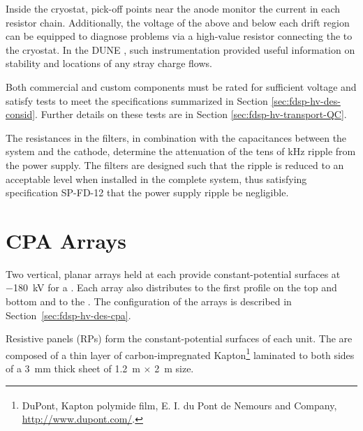 Inside the cryostat, pick-off points near the anode monitor the current  
in each resistor chain.  Additionally, the voltage of the  above and below each drift region can be equipped to diagnose problems via a high-value resistor connecting the  to the cryostat.  In the DUNE , such instrumentation provided useful information on  stability and locations of %
any stray charge flows. %

Both commercial and custom  components must be rated for sufficient voltage and satisfy tests to meet the specifications %
summarized in Section \ref{sec:fdsp-hv-des-consid}.  Further details on these tests are in Section \ref{sec:fdsp-hv-transport-QC}.

The resistances in the filters, in combination with the capacitances between the  system and the cathode,
 determine the attenuation of the tens of \si{\kilo\hertz} ripple from the power supply.  The filters  
are designed such that the ripple is reduced to an acceptable level when installed in the complete system, thus satisfying specification %
SP-FD-12   %
that the power supply ripple be negligible. %

\section{CPA Arrays}

Two vertical, planar  arrays held at  each provide constant-potential surfaces at \SI{-180}{\kV} for a . Each  array also distributes  to the first profile on the top and bottom  and to the . The configuration of the  arrays is described in Section~\ref{sec:fdsp-hv-des-cpa}.

Resistive panels (RPs) form the constant-potential surfaces of each  unit. The  are  composed of a thin layer of carbon-impregnated Kapton\footnote{DuPont\texttrademark{}, Kapton\textsuperscript{\textregistered} polymide film,  E. I. du Pont de Nemours and Company,  \url{http://www.dupont.com/}.} laminated to both sides of a \SI{3}{\milli\meter} thick \frfour sheet of \SI{1.2}{\meter}  $\times$ \SI{2}{\meter} size.  

